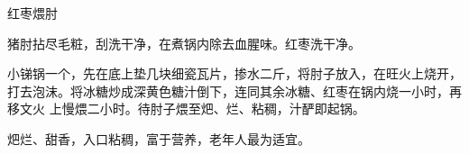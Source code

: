 \begin{recipe}{红枣煨肘}

\ingredients


\preparation

\step 猪肘拈尽毛粧，刮洗干净，在煮锅内除去血腥味。红枣洗干净。

\step 小锑锅一个，先在底上垫几块细瓷瓦片，掺水二斤，将肘子放入，在旺火上烧开，
打去泡沫。将冰糖炒成深黄色糖汁倒下，连同其余冰糖、红枣在锅内烧一小时，再移文火
上慢煨二小时。待肘子煨至𤆵、烂、粘稠，汁酽即起锅。

\features

𤆵烂、甜香，入口粘稠，富于营养，老年人最为适宜。

\end{recipe}


